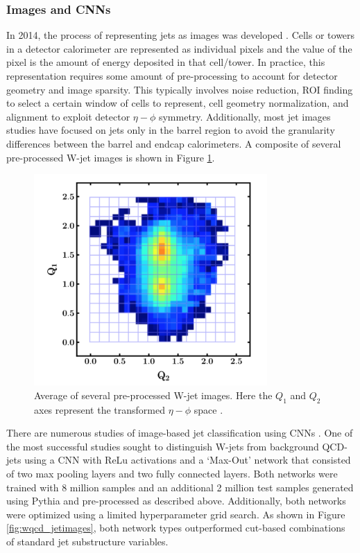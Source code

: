 \subsubsection{Images and CNNs}\label{sec:cnn_ids}
In 2014, the process of representing jets as images was developed \cite{jetimages1}. Cells or towers in a detector calorimeter are represented as individual pixels and the value of the pixel is the amount of energy deposited in that cell/tower. In practice, this representation requires some amount of pre-processing to account for detector geometry and image sparsity. This typically involves noise reduction, ROI finding to select a certain window of cells to represent, cell geometry normalization, and alignment to exploit detector $\eta-\phi$ symmetry. Additionally, most jet images studies have focused on jets only in the barrel region to avoid the granularity differences between the barrel and endcap calorimeters. A composite of several pre-processed W-jet images is shown in Figure \ref{fig:jet_image}.

\begin{figure}[htb!]
    \centering
    \includegraphics[width=3.5in]{figures/chapter4/jet_image.png}
    \caption{Average of several pre-processed W-jet images. Here the $Q_1$ and $Q_2$ axes represent the transformed $\eta-\phi$ space \cite{jetimages1}.}
    \label{fig:jet_image}
\end{figure}

There are numerous studies of image-based jet classification using CNNs \cite{ben_jet_paper}. One of the most successful studies sought to distinguish W-jets from background QCD-jets \cite{wqcd_jetimages} using a CNN with ReLu activations and a `Max-Out' network that consisted of two max pooling layers and two fully connected layers. Both networks were trained with 8 million samples and an additional 2 million test samples generated using Pythia and pre-processed as described above. Additionally, both networks were optimized using a limited hyperparameter grid search. As shown in Figure \ref{fig:wqcd_jetimages}, both network types outperformed cut-based combinations of standard jet substructure variables.\\

